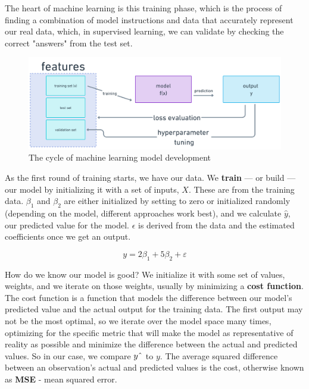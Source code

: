 \documentclass[11pt, table]{diazessay} %
\begin{document}
\begin{sloppypar}
The heart of machine learning is this training phase, which is the process of finding a combination of model instructions and data that accurately represent our real data, which, in supervised learning, we can validate by checking the correct "answers" from the test set.

\begin{figure}[H]
  \includegraphics[width=\linewidth]{figures/model_cycle.png}
  \caption{The cycle of machine learning model development}
\end{figure}

As the first round of training starts, we have our data. We \textbf{train} --- or build  --- our model by initializing it with a set of inputs, $X$. These are from the training data. $\beta_1$ and $\beta_2$ are either initialized by setting to zero or initialized randomly (depending on the model, different approaches work best), and we calculate $\hat{y}$, our predicted value for the model. $\epsilon$ is derived from the data and the estimated coefficients once we get an output.

\begin{equation}
y = 2\beta_1 + 5\beta_2 + \varepsilon
\end{equation}

How do we know our model is good? We initialize it with some set of values, weights, and we iterate on those weights, usually by minimizing a \textbf{cost function}. The cost function is a function that models the difference between our model's predicted value and the actual output for the training data. The first output may not be the most optimal, so we iterate over the model space many times, optimizing for the specific metric that will make the model as representative of reality as possible and minimize the difference between the actual and predicted values. So in our case, we compare $y\string^$ to $y$. The average squared difference between an observation’s actual and predicted values is the cost, otherwise known as \textbf{MSE} - mean squared error.


\end{sloppypar}
\end{document}
